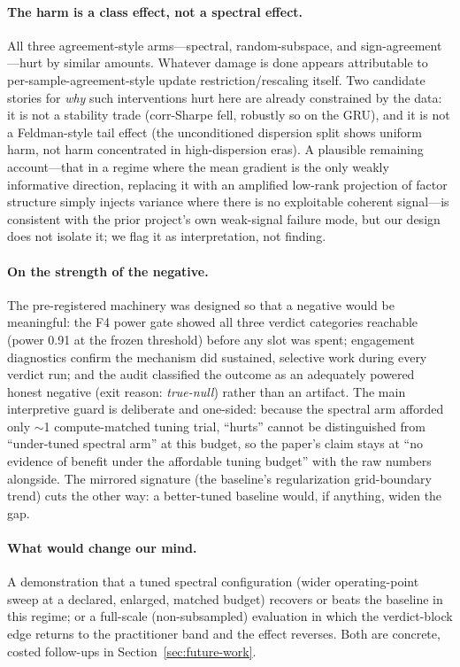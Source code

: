 \paragraph{The harm is a class effect, not a spectral effect.} All three
agreement-style arms---spectral, random-subspace, and sign-agreement---hurt
by similar amounts. Whatever damage is done appears attributable to
per-sample-agreement-style update restriction/rescaling itself. Two
candidate stories for \emph{why} such interventions hurt here are already
constrained by the data: it is not a stability trade (corr-Sharpe fell,
robustly so on the GRU), and it is not a Feldman-style tail effect (the
unconditioned dispersion split shows uniform harm, not harm concentrated in
high-dispersion eras). A plausible remaining account---that in a regime
where the mean gradient is the only weakly informative direction, replacing
it with an amplified low-rank projection of factor structure simply
injects variance where there is no exploitable coherent signal---is
consistent with the prior project's own weak-signal failure mode, but our
design does not isolate it; we flag it as interpretation, not finding.

\paragraph{On the strength of the negative.} The pre-registered machinery
was designed so that a negative would be meaningful: the F4 power gate
showed all three verdict categories reachable (power 0.91 at the frozen
threshold) before any slot was spent; engagement diagnostics confirm the
mechanism did sustained, selective work during every verdict run; and the
audit classified the outcome as an adequately powered honest negative
(exit reason: \emph{true-null}) rather than an artifact. The main
interpretive guard is deliberate and one-sided: because the spectral arm
afforded only $\sim$1 compute-matched tuning trial, ``hurts'' cannot be
distinguished from ``under-tuned spectral arm'' at this budget, so the
paper's claim stays at ``no evidence of benefit under the affordable
tuning budget'' with the raw numbers alongside. The mirrored signature
(the baseline's regularization grid-boundary trend) cuts the other way:
a better-tuned baseline would, if anything, widen the gap.

\paragraph{What would change our mind.} A demonstration that a tuned
spectral configuration (wider operating-point sweep at a declared,
enlarged, matched budget) recovers or beats the baseline in this regime;
or a full-scale (non-subsampled) evaluation in which the verdict-block
edge returns to the practitioner band and the effect reverses. Both are
concrete, costed follow-ups in Section~\ref{sec:future-work}.
